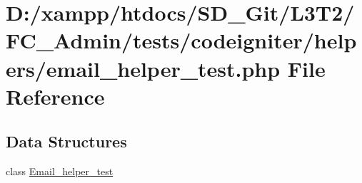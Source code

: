 \hypertarget{_admin_2tests_2codeigniter_2helpers_2email__helper__test_8php}{}\section{D\+:/xampp/htdocs/\+S\+D\+\_\+\+Git/\+L3\+T2/\+F\+C\+\_\+\+Admin/tests/codeigniter/helpers/email\+\_\+helper\+\_\+test.php File Reference}
\label{_admin_2tests_2codeigniter_2helpers_2email__helper__test_8php}
\subsection*{Data Structures}
\begin{DoxyCompactItemize}
\item 
class \hyperlink{class_email__helper__test}{Email\+\_\+helper\+\_\+test}
\end{DoxyCompactItemize}
